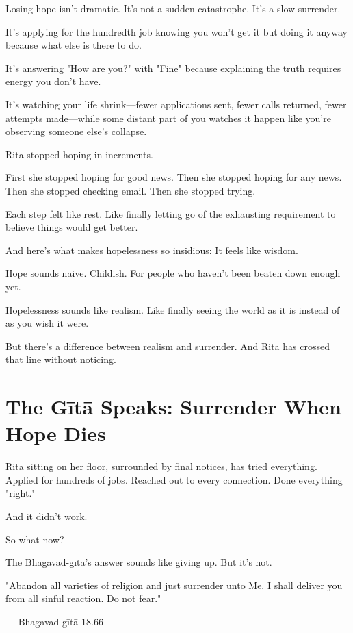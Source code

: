 \documentclass[11pt,twoside]{book}
\begin{document}
Losing hope isn't dramatic. It's not a sudden catastrophe. It's a slow surrender.

It's applying for the hundredth job knowing you won't get it but doing it anyway because what else is there to do.

It's answering "How are you?" with "Fine" because explaining the truth requires energy you don't have.

It's watching your life shrink—fewer applications sent, fewer calls returned, fewer attempts made—while some distant part of you watches it happen like you're observing someone else's collapse.

Rita stopped hoping in increments.

First she stopped hoping for good news. Then she stopped hoping for any news. Then she stopped checking email. Then she stopped trying.

Each step felt like rest. Like finally letting go of the exhausting requirement to believe things would get better.

And here's what makes hopelessness so insidious: It feels like wisdom.

Hope sounds naive. Childish. For people who haven't been beaten down enough yet.

Hopelessness sounds like realism. Like finally seeing the world as it is instead of as you wish it were.

But there's a difference between realism and surrender. And Rita has crossed that line without noticing.

\section*{The Gītā Speaks: Surrender When Hope Dies}

Rita sitting on her floor, surrounded by final notices, has tried everything. Applied for hundreds of jobs. Reached out to every connection. Done everything "right."

And it didn't work.

So what now?

The Bhagavad-gītā's answer sounds like giving up. But it's not.

\begin{pullquote}
"Abandon all varieties of religion and just surrender unto Me. I shall deliver you from all sinful reaction. Do not fear."

--- Bhagavad-gītā 18.66
\end{pullquote}
\end{document}
